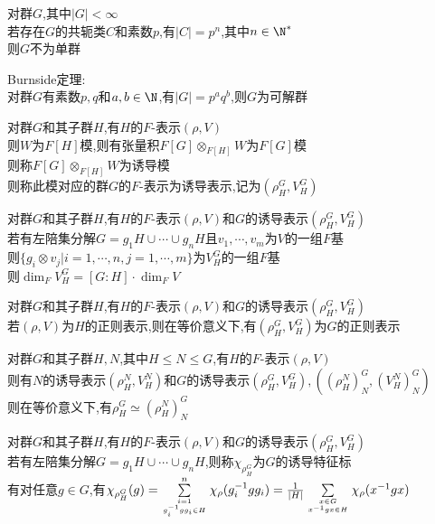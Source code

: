 \begin{dingli}
对群$G$,其中$|G|<\infty$\\
若存在$G$的共轭类$C$和素数$p$,有$|C|=p^n$,其中$n\in\N^*$\\
则$G$不为单群
\end{dingli}

\begin{dingli}
Burnside定理:\\
对群$G$有素数$p,q$和$a,b\in \N$,有$|G|=p^aq^b$,则$G$为可解群
\end{dingli}

\begin{dingyi}
对群$G$和其子群$H$,有$H$的$F$-表示$(\rho,V)$\\
则$W$为$F[H]$模,则有张量积$F[G]\otimes_{F[H]}W$为$F[G]$模\\
则称$F[G]\otimes_{F[H]}W$为诱导模\\
则称此模对应的群$G$的$F$-表示为诱导表示,记为$(\rho_{H}^{G},V_{H}^{G})$
\end{dingyi}

\begin{dingli}
对群$G$和其子群$H$,有$H$的$F$-表示$(\rho,V)$和$G$的诱导表示$(\rho_{H}^{G},V_{H}^{G})$\\
若有左陪集分解$G=g_1H\cup\cdots\cup g_nH$且$v_1,\cdots,v_m$为$V$的一组$F$基\\
则$\{g_i\otimes v_j|i=1,\cdots,n,j=1,\cdots,m\}$为$V_{H}^{G}$的一组$F$基\\
则$\dim_{F}V_{H}^{G}=[G:H]\cdot\dim_{F}V$
\end{dingli}

\begin{dingli}
对群$G$和其子群$H$,有$H$的$F$-表示$(\rho,V)$和$G$的诱导表示$(\rho_{H}^{G},V_{H}^{G})$\\
若$(\rho,V)$为$H$的正则表示,则在等价意义下,有$(\rho_{H}^{G},V_{H}^{G})$为$G$的正则表示
\end{dingli}

\begin{dingli}
对群$G$和其子群$H,N$,其中$H\leq N\leq G$,有$H$的$F$-表示$(\rho,V)$\\
则有$N$的诱导表示$(\rho_{H}^{N},V_{H}^{N})$和$G$的诱导表示$(\rho_{H}^{G},V_{H}^{G}),((\rho_{H}^{N})_{N}^{G},(V_{H}^{N})_{N}^{G})$\\
则在等价意义下,有$\rho_{H}^{G}\simeq (\rho_{H}^{N})_{N}^{G}$
\end{dingli}

\begin{dingyi}
对群$G$和其子群$H$,有$H$的$F$-表示$(\rho,V)$和$G$的诱导表示$(\rho_{H}^{G},V_{H}^{G})$\\
若有左陪集分解$G=g_1H\cup\cdots\cup g_nH$,则称$\chi_{\rho_{H}^{G}}$为$G$的诱导特征标\\
有对任意$g\in G$,有$\chi_{\rho_{H}^{G}}(g)=\sum\limits_{i=1\atop g_{i}^{-1}gg_{i}\in H }^{n}\chi_{\rho}(g_{i}^{-1}gg_{i})=\frac{1}{|H|}\sum\limits_{x\in G\atop x^{-1}gx\in H}\chi_{\rho}(x^{-1}gx)$
\end{dingyi}

